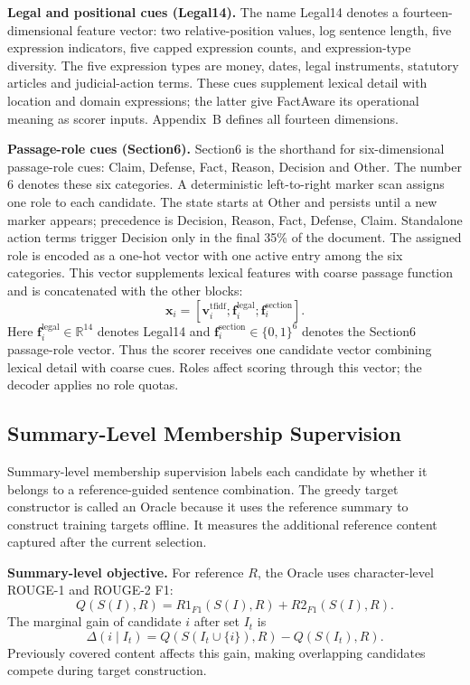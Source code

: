 \documentclass[10pt,twocolumn,letterpaper]{article}
\begin{document}
\textbf{Legal and positional cues (Legal14).} The name Legal14 denotes a fourteen-dimensional feature vector: two relative-position values, log sentence length, five expression indicators, five capped expression counts, and expression-type diversity. The five expression types are money, dates, legal instruments, statutory articles and judicial-action terms. These cues supplement lexical detail with location and domain expressions; the latter give FactAware its operational meaning as scorer inputs. Appendix~B defines all fourteen dimensions.

\textbf{Passage-role cues (Section6).} Section6 is the shorthand for six-dimensional passage-role cues: Claim, Defense, Fact, Reason, Decision and Other. The number 6 denotes these six categories. A deterministic left-to-right marker scan assigns one role to each candidate. The state starts at Other and persists until a new marker appears; precedence is Decision, Reason, Fact, Defense, Claim. Standalone action terms trigger Decision only in the final 35\% of the document. The assigned role is encoded as a one-hot vector with one active entry among the six categories. This vector supplements lexical features with coarse passage function and is concatenated with the other blocks:
\begin{equation}
\mathbf{x}_i=[\mathbf{v}^{\mathrm{tfidf}}_i;\mathbf{f}^{\mathrm{legal}}_i;\mathbf{f}^{\mathrm{section}}_i].
\end{equation}
Here $\mathbf f_i^{\mathrm{legal}}\in\mathbb R^{14}$ denotes Legal14 and $\mathbf f_i^{\mathrm{section}}\in\{0,1\}^6$ denotes the Section6 passage-role vector. Thus the scorer receives one candidate vector combining lexical detail with coarse cues. Roles affect scoring through this vector; the decoder applies no role quotas.

\subsection{Summary-Level Membership Supervision}\label{budget-consistent-oracle-supervision}
Summary-level membership supervision labels each candidate by whether it belongs to a reference-guided sentence combination. The greedy target constructor is called an Oracle because it uses the reference summary to construct training targets offline. It measures the additional reference content captured after the current selection.

\textbf{Summary-level objective.} For reference $R$, the Oracle uses character-level ROUGE-1 and ROUGE-2 F1:
\begin{equation}
Q(S(I),R)=R1_{F1}(S(I),R)+R2_{F1}(S(I),R).
\end{equation}
The marginal gain of candidate $i$ after set $I_t$ is
\begin{equation}
\Delta(i\mid I_t)=Q(S(I_t\cup\{i\}),R)-Q(S(I_t),R).
\end{equation}
Previously covered content affects this gain, making overlapping candidates compete during target construction.
\end{document}

